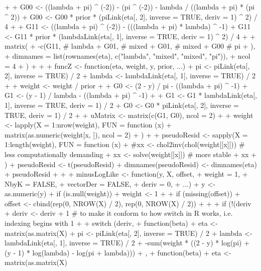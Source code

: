 \documentclass[
]{jss}
\newcommand{\1}{\mathcal{I}} \newcommand{\bZero}{\boldsymbol{0}}
\begin{document}
\begin{CodeChunk}
\begin{CodeInput}
{{+     
+     G00 <- ((lambda + pi) ^ (-2)) - (pi ^ (-2)) - lambda / ((lambda + pi) * (pi ^ 2))
+     G00 <- G00 * prior * (piLink(eta[, 2], inverse = TRUE, deriv = 1) ^ 2) / 4
+     
+     G11 <- ((lambda + pi) ^ (-2)) - (((lambda + pi) * lambda) ^ -1)
+     G11 <- G11 * prior * (lambdaLink(eta[, 1], inverse = TRUE, deriv = 1) ^ 2) / 4
+     
+     matrix(
+       -c(G11, # lambda
+          G01, # mixed
+          G01, # mixed
+          G00  # pi
+       ),
+       dimnames = list(rownames(eta), c("lambda", "mixed", "mixed", "pi")),
+       ncol = 4
+     )
+   }
+   
+   funcZ <- function(eta, weight, y, prior, ...) {
+     pi     <-     piLink(eta[, 2], inverse = TRUE) / 2
+     lambda <- lambdaLink(eta[, 1], inverse = TRUE) / 2
+     
+     weight <- weight / prior
+     
+     G0 <- (2 - y) / pi     - ((lambda + pi) ^ -1)
+     G1 <- (y - 1) / lambda - ((lambda + pi) ^ -1)
+     
+     G1 <- G1 * lambdaLink(eta[, 1], inverse = TRUE, deriv = 1) / 2
+     G0 <- G0 *     piLink(eta[, 2], inverse = TRUE, deriv = 1) / 2
+     
+     uMatrix <- matrix(c(G1, G0), ncol = 2)
+     
+     weight <- lapply(X = 1:nrow(weight), FUN = function (x) {
+       matrix(as.numeric(weight[x, ]), ncol = 2)
+     })
+     
+     pseudoResid <- sapply(X = 1:length(weight), FUN = function (x) {
+       #xx <- chol2inv(chol(weight[[x]])) # less computationally demanding
+       xx <- solve(weight[[x]]) # more stable
+       xx %
+     })
+     pseudoResid <- t(pseudoResid)
+     dimnames(pseudoResid) <- dimnames(eta)
+     pseudoResid
+   }
+   
+   minusLogLike <- function(y, X, offset,
+                            weight    = 1, 
+                            NbyK      = FALSE, 
+                            vectorDer = FALSE, 
+                            deriv     = 0, 
+                            ...) {
+     y <- as.numeric(y)
+     if (is.null(weight)) {
+       weight <- 1
+     }
+     if (missing(offset)) {
+       offset <- cbind(rep(0, NROW(X) / 2), rep(0, NROW(X) / 2))
+     }
+     
+     if (!(deriv %
+     deriv <- deriv + 1 # to make it conform to how switch in R works, i.e. indexing begins with 1
+     
+     switch (deriv,
+       function(beta) {
+         eta <- matrix(as.matrix(X) %
+         pi     <-     piLink(eta[, 2], inverse = TRUE) / 2
+         lambda <- lambdaLink(eta[, 1], inverse = TRUE) / 2
+         -sum(weight * ((2 - y) * log(pi) + (y - 1) * log(lambda) - log(pi + lambda)))
+       },
+       function(beta) {
+         eta <- matrix(as.matrix(X) %
}}}
\end{CodeInput}
\end{CodeChunk}
\end{document}
